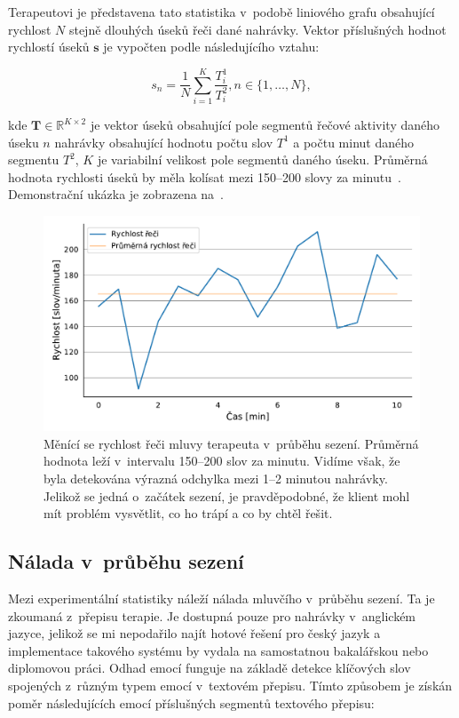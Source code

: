 Terapeutovi je představena tato statistika v~podobě liniového grafu obsahující rychlost $N$ stejně dlouhých úseků řeči dané nahrávky. Vektor příslušných hodnot rychlostí úseků $\mathbf{s}$ je vypočten podle následujícího vztahu:

\begin{equation}
    \label{eqn:Speech_speed}
    s_{n} = \frac{1}{N} \sum_{i=1}^{K}\frac{T_{i}^{1}}{T_{i}^{2}}, n \in \{1, \dots, N\},
\end{equation}

kde $\mathbf{T} \in \mathbb{R}^{K \times 2}$ je vektor úseků obsahující pole segmentů řečové aktivity daného úseku $n$ nahrávky obsahující hodnotu počtu slov $T^{1}$ a počtu minut daného segmentu $T^{2}$, $K$ je variabilní velikost pole segmentů daného úseku. Průměrná hodnota rychlosti úseků by měla kolísat mezi 150--200 slovy za minutu~\cite{Rodero_speed}. Demonstrační ukázka je zobrazena na~. 

\begin{figure}[ht]
  \centering
  \includegraphics[width=\linewidth]{obrazky-figures/text_plots/speed_therapist.pdf}
  \caption{Měnící se rychlost řeči mluvy terapeuta v~průběhu sezení. Průměrná hodnota leží v~intervalu 150--200 slov za minutu. Vidíme však, že byla detekována výrazná odchylka mezi 1--2 minutou nahrávky. Jelikož se jedná o~začátek sezení, je pravděpodobné, že klient mohl mít problém vysvětlit, co ho trápí a co by chtěl řešit.}
  \label{fig:Statisctics_speed}
\end{figure}


\subsection{Nálada v~průběhu sezení}
Mezi experimentální statistiky náleží nálada mluvčího v~průběhu sezení. Ta je zkoumaná z~přepisu terapie. Je dostupná pouze pro nahrávky v~anglickém jazyce, jelikož se mi nepodařilo najít hotové řešení pro český jazyk a implementace takového systému by vydala na samostatnou bakalářskou nebo diplomovou práci. Odhad emocí funguje na základě detekce klíčových slov spojených z~různým typem emocí v~textovém přepisu. Tímto způsobem je získán poměr následujících emocí příslušných segmentů textového přepisu:

